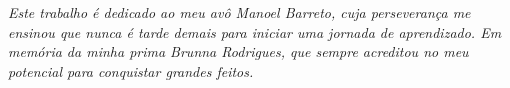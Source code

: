 \begin{dedicatoria}
   \vspace*{\fill}
   \centering
   \noindent
    \textit{Este trabalho é dedicado ao meu avô Manoel Barreto, cuja perseverança me ensinou que nunca é tarde demais para iniciar uma jornada de aprendizado. Em memória da minha prima Brunna Rodrigues, que sempre acreditou no meu potencial para conquistar grandes feitos.} \vspace*{\fill}


\end{dedicatoria}

